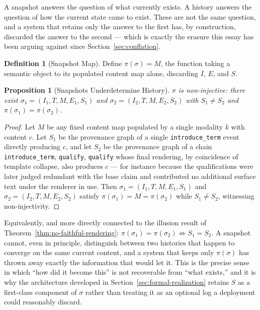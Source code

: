 \documentclass[11pt]{article}
\newtheorem{proposition}[theorem]{Proposition}
\theoremstyle{definition}
\newtheorem{definition}[theorem]{Definition}
\begin{document}
A snapshot answers the question of what currently exists. A history answers the question of how the current state came to exist. These are not the same question, and a system that retains only the answer to the first has, by construction, discarded the answer to the second --- which is exactly the erasure this essay has been arguing against since Section~\ref{sec:conflation}.

\begin{definition}[Snapshot Map]
\label{def:snapshot-map}
Define $\pi(\sigma) = M$, the function taking a semantic object to its populated content map alone, discarding $I$, $E$, and $S$.
\end{definition}

\begin{proposition}[Snapshots Underdetermine History]
\label{prop:snapshot-underdetermine}
$\pi$ is non-injective: there exist $\sigma_1 = (I_1, T, M, E_1, S_1)$ and $\sigma_2 = (I_2, T, M, E_2, S_2)$ with $S_1 \neq S_2$ and $\pi(\sigma_1) = \pi(\sigma_2)$.
\end{proposition}

\begin{proof}
Let $M$ be any fixed content map populated by a single modality $k$ with content $c$. Let $S_1$ be the provenance graph of a single \texttt{introduce\_term} event directly producing $c$, and let $S_2$ be the provenance graph of a chain \texttt{introduce\_term}, \texttt{qualify}, \texttt{qualify} whose final rendering, by coincidence of template collapse, also produces $c$ --- for instance because the qualifications were later judged redundant with the base claim and contributed no additional surface text under the renderer in use. Then $\sigma_1 = (I_1, T, M, E_1, S_1)$ and $\sigma_2 = (I_2, T, M, E_2, S_2)$ satisfy $\pi(\sigma_1) = M = \pi(\sigma_2)$ while $S_1 \neq S_2$, witnessing non-injectivity.
\end{proof}

Equivalently, and more directly connected to the illusion result of Theorem~\ref{thm:no-faithful-rendering}: $\pi(\sigma_1) = \pi(\sigma_2) \not\Rightarrow S_1 = S_2$. A snapshot cannot, even in principle, distinguish between two histories that happen to converge on the same current content, and a system that keeps only $\pi(\sigma)$ has thrown away exactly the information that would let it. This is the precise sense in which ``how did it become this'' is not recoverable from ``what exists,'' and it is why the architecture developed in Section~\ref{sec:formal-realization} retains $S$ as a first-class component of $\sigma$ rather than treating it as an optional log a deployment could reasonably discard.
\end{document}

